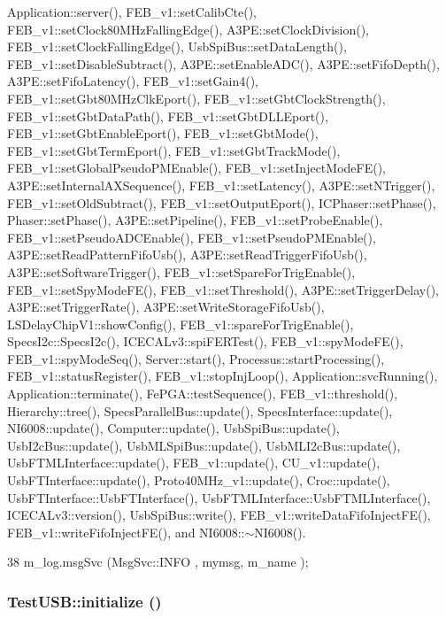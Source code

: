 Application::server(), FEB\_\-v1::setCalibCte(), FEB\_\-v1::setClock80MHzFallingEdge(), A3PE::setClockDivision(), FEB\_\-v1::setClockFallingEdge(), UsbSpiBus::setDataLength(), FEB\_\-v1::setDisableSubtract(), A3PE::setEnableADC(), A3PE::setFifoDepth(), A3PE::setFifoLatency(), FEB\_\-v1::setGain4(), FEB\_\-v1::setGbt80MHzClkEport(), FEB\_\-v1::setGbtClockStrength(), FEB\_\-v1::setGbtDataPath(), FEB\_\-v1::setGbtDLLEport(), FEB\_\-v1::setGbtEnableEport(), FEB\_\-v1::setGbtMode(), FEB\_\-v1::setGbtTermEport(), FEB\_\-v1::setGbtTrackMode(), FEB\_\-v1::setGlobalPseudoPMEnable(), FEB\_\-v1::setInjectModeFE(), A3PE::setInternalAXSequence(), FEB\_\-v1::setLatency(), A3PE::setNTrigger(), FEB\_\-v1::setOldSubtract(), FEB\_\-v1::setOutputEport(), ICPhaser::setPhase(), Phaser::setPhase(), A3PE::setPipeline(), FEB\_\-v1::setProbeEnable(), FEB\_\-v1::setPseudoADCEnable(), FEB\_\-v1::setPseudoPMEnable(), A3PE::setReadPatternFifoUsb(), A3PE::setReadTriggerFifoUsb(), A3PE::setSoftwareTrigger(), FEB\_\-v1::setSpareForTrigEnable(), FEB\_\-v1::setSpyModeFE(), FEB\_\-v1::setThreshold(), A3PE::setTriggerDelay(), A3PE::setTriggerRate(), A3PE::setWriteStorageFifoUsb(), LSDelayChipV1::showConfig(), FEB\_\-v1::spareForTrigEnable(), SpecsI2c::SpecsI2c(), ICECALv3::spiFERTest(), FEB\_\-v1::spyModeFE(), FEB\_\-v1::spyModeSeq(), Server::start(), Processus::startProcessing(), FEB\_\-v1::statusRegister(), FEB\_\-v1::stopInjLoop(), Application::svcRunning(), Application::terminate(), FePGA::testSequence(), FEB\_\-v1::threshold(), Hierarchy::tree(), SpecsParallelBus::update(), SpecsInterface::update(), NI6008::update(), Computer::update(), UsbSpiBus::update(), UsbI2cBus::update(), UsbMLSpiBus::update(), UsbMLI2cBus::update(), UsbFTMLInterface::update(), FEB\_\-v1::update(), CU\_\-v1::update(), UsbFTInterface::update(), Proto40MHz\_\-v1::update(), Croc::update(), UsbFTInterface::UsbFTInterface(), UsbFTMLInterface::UsbFTMLInterface(), ICECALv3::version(), UsbSpiBus::write(), FEB\_\-v1::writeDataFifoInjectFE(), FEB\_\-v1::writeFifoInjectFE(), and NI6008::$\sim$NI6008().


\begin{DoxyCode}
38 { m_log.msgSvc (MsgSvc::INFO    , mymsg, m_name ); }
\end{DoxyCode}
\hypertarget{classTestUSB_ae7cca13f49e4180c93f9f5a3cbd05985}{
\subsubsection[{initialize}]{ TestUSB::initialize ()}}
\label{classTestUSB_ae7cca13f49e4180c93f9f5a3cbd05985}


